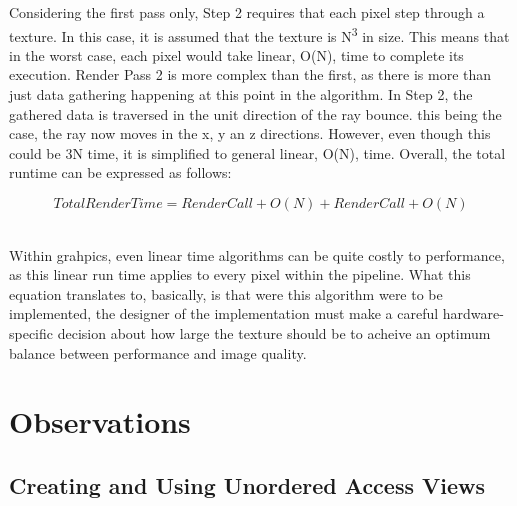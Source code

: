 \documentclass[a4paper, 12pt]{article}
\begin{document}
\noindent Considering the first pass only, Step 2 requires that each pixel
step through a texture. In this case, it is assumed that the texture is
N\textsuperscript{3} in size. This means that in the worst case, each pixel
would take linear, O(N), time to complete its execution. Render Pass 2 is more
complex than the first, as there is more than just data gathering happening at
this point in the algorithm. In Step 2, the gathered data is traversed in the
unit direction of the ray bounce. this being the case, the ray now moves in
the x, y an z directions. However, even though this could be 3N time, it is
simplified to general linear, O(N), time. Overall, the total runtime can be
expressed as follows:

\begin{equation}
Total Render Time = RenderCall + O(N) + RenderCall + O(N)
\end{equation}

\noindent \\ Within grahpics, even linear time algorithms can be quite costly
to performance, as this linear run time applies to every pixel within the
pipeline. What this equation translates to, basically, is that were this
algorithm were to be implemented, the designer of the implementation must make
a careful hardware-specific decision about how large the texture should be to
acheive an optimum balance between performance and image quality.

\section{Observations}

\subsection{Creating and Using Unordered Access Views}
\label{section:UAVs}
\end{document}
